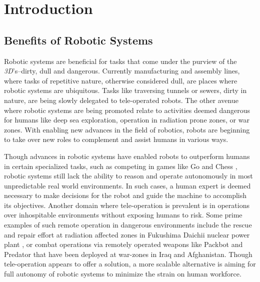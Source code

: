 
\chapter{Introduction}
\label{chap:thesis_intro}

\section{Benefits of Robotic Systems}

Robotic systems are beneficial for tasks that come under the purview of the \emph{3D}'s--dirty, dull and dangerous. 
Currently manufacturing and assembly lines, where tasks of repetitive nature, otherwise considered dull, are places where robotic systems are ubiquitous. Tasks like traversing tunnels or sewers, dirty in nature, are being slowly delegated to tele-operated robots. 
The other avenue where robotic systems are being promoted relate to activities deemed dangerous for humans like deep sea exploration, operation in radiation prone zones, 
or war zones. With enabling new advances in the field of robotics, robots are beginning to take over new roles to complement and assist humans in various ways.

Though advances in robotic systems have enabled robots to outperform humans in certain specialized tasks, such as competing in games like Go \cite{deepmind} and Chess \cite{deepblue}, 
robotic systems still lack the ability to reason and operate
autonomously in most unpredictable real world environments. 
In such cases, a human expert is deemed necessary to make decisions for the robot and guide the machine
to accomplish its objectives. Another domain where tele-operation is prevalent is in operations over inhospitable environments without exposing humans to risk. Some prime examples of such remote operation in
dangerous environments include the rescue and repair effort at radiation affected zones in Fukushima Daichii nuclear power plant \cite{fukushima}, or combat operations via remotely operated weapons like Packbot \cite{packbot} and Predator \cite{predator} that have been deployed
at war-zones in Iraq and Afghanistan. Though tele-operation appears to offer a solution, a more scalable alternative
is aiming for full autonomy of robotic systems to minimize the strain on human workforce.

